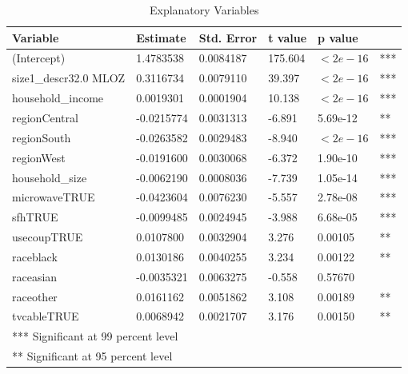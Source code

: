 \documentclass[11pt, fleqn]{article}
\begin{document}
\begin{table}
  \begin{tabular}{l l l l l l}
    \toprule
    Variable            & Estimate  & Std. Error &  t value  & p value & \\
    \midrule
    (Intercept)           & 1.4783538 & 0.0084187 & 175.604 & $<2e-16$ & ***\\
    size1\_descr32.0 MLOZ  & 0.3116734 & 0.0079110 & 39.397 & $<2e-16$ & *** \\
    household\_income      & 0.0019301 & 0.0001904 & 10.138 & $<2e-16$ & *** \\
    regionCentral         & -0.0215774 & 0.0031313 & -6.891 & 5.69e-12 & ** \\
    regionSouth           & -0.0263582 & 0.0029483 & -8.940 & $<2e-16$ & *** \\
    regionWest            & -0.0191600 & 0.0030068 & -6.372 & 1.90e-10 & *** \\
    household\_size        & -0.0062190 & 0.0008036 & -7.739 & 1.05e-14 & *** \\
    microwaveTRUE         & -0.0423604 & 0.0076230 & -5.557 & 2.78e-08 & *** \\
    sfhTRUE               & -0.0099485 & 0.0024945 & -3.988 & 6.68e-05 & *** \\
    usecoupTRUE           & 0.0107800 & 0.0032904 & 3.276 & 0.00105 & **  \\
    raceblack             & 0.0130186 & 0.0040255 & 3.234 & 0.00122 & **  \\
    raceasian             & -0.0035321 & 0.0063275 & -0.558 & 0.57670 & \\
    raceother             & 0.0161162 & 0.0051862 & 3.108 & 0.00189 & **  \\
    tvcableTRUE           & 0.0068942 & 0.0021707 & 3.176 & 0.00150 & **  \\
    \midrule
    \multicolumn{6}{l}{*** Significant at 99 percent level}\\
    \multicolumn{6}{l}{** Significant at 95 percent level}\\
    \bottomrule
  \end{tabular}
  \caption{Explanatory Variables}
  \label{tab:regress}
\end{table}
\end{document}
